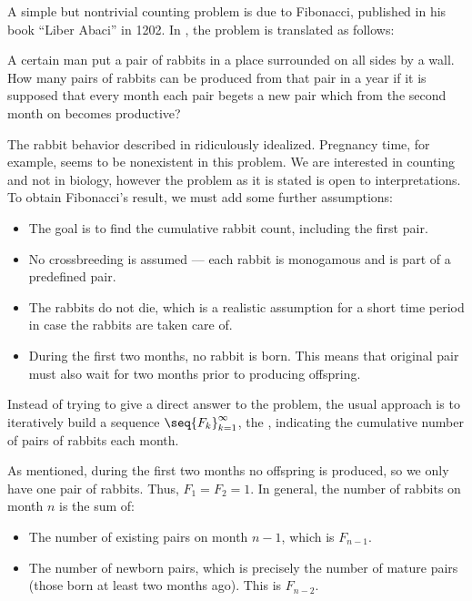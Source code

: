 \begin{example}\label{ex:fibonacci_rabbits}
  A simple but nontrivial counting problem is due to Fibonacci, published in his book \enquote{Liber Abaci} in 1202. In \cite{MacTutor:fibonacci}, the problem is translated as follows:
  \begin{displayquote}
    A certain man put a pair of rabbits in a place surrounded on all sides by a wall. How many pairs of rabbits can be produced from that pair in a year if it is supposed that every month each pair begets a new pair which from the second month on becomes productive?
  \end{displayquote}

  The rabbit behavior described in ridiculously idealized. Pregnancy time, for example, seems to be nonexistent in this problem. We are interested in counting and not in biology, however the problem as it is stated is open to interpretations. To obtain Fibonacci's result, we must add some further assumptions:
  \begin{itemize}
    \item The goal is to find the cumulative rabbit count, including the first pair.
    \item No crossbreeding is assumed --- each rabbit is monogamous and is part of a predefined pair.
    \item The rabbits do not die, which is a realistic assumption for a short time period in case the rabbits are taken care of.
    \item During the first two months, no rabbit is born. This means that original pair must also wait for two months prior to producing offspring.
  \end{itemize}

  Instead of trying to give a direct answer to the problem, the usual approach is to iteratively build a sequence \( \seq{ F_k }_{k=1}^\infty \), the , indicating the cumulative number of pairs of rabbits each month.

  As mentioned, during the first two months no offspring is produced, so we only have one pair of rabbits. Thus, \( F_1 = F_2 = 1 \). In general, the number of rabbits on month \( n \) is the sum of:
  \begin{itemize}
    \item The number of existing pairs on month \( n - 1 \), which is \( F_{n - 1} \).
    \item The number of newborn pairs, which is precisely the number of mature pairs (those born at least two months ago). This is \( F_{n - 2} \).
  \end{itemize}


\end{example}
